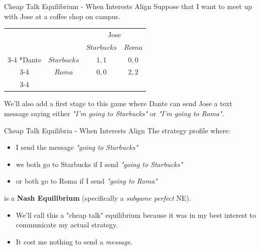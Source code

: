 

\begin{frame}{Cheap Talk Equilibrium - When Interests Align}
  Suppose that I want to meet up with Jose at a coffee shop on campus.
  \begin{table}[!h]
    \centering
    \begin{tabular}{cc|c|c|}
    & \multicolumn{1}{c}{} & \multicolumn{2}{c}{Jose}\\
    & \multicolumn{1}{c}{} & \multicolumn{1}{c}{$Starbucks$}  & \multicolumn{1}{c}{$Roma$} \\\cline{3-4}
    \multirow{2}*{Dante}  & $Starbucks$ & $1, 1$ & $0,0$ \\\cline{3-4}
                          & $Roma$       & $0, 0$ & $2,2$ \\\cline{3-4}
  \end{tabular}
  \end{table}

  We'll also add a first stage to this game 
  where Dante can send Jose a text message saying either 
  \textit{"I'm going to Starbucks"} or \textit{"I'm going to Roma"}.
\end{frame}


\begin{frame}{Cheap Talk Equilibria - When Interests Align}
  The strategy profile where:
  \begin{itemize}
    \item  
    I send the message \textit{"going to Starbucks"}
    \item
    we both go to Starbucks if I send \textit{"going to Starbucks"}
    \item 
    or both go to Roma if I send \textit{"going to Roma"}
  \end{itemize}
  is a \textbf{Nash Equilibrium} (specifically a \textit{subgame perfect} NE).
  \begin{itemize}
    \item We'll call this a \alert{"cheap talk"} equilibrium 
    because it was in my best interest to communicate my actual strategy.
    \item It cost me nothing to send a \textit{message}.
  \end{itemize}
\end{frame}


